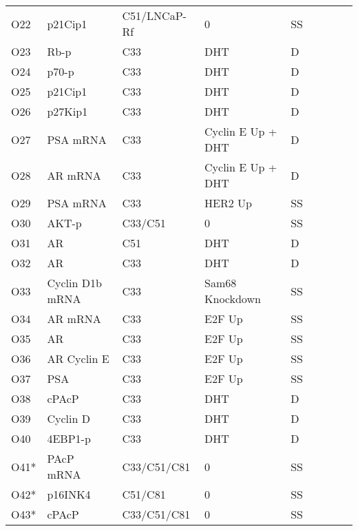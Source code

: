 \begin{center}
\begin{scriptsize}
\begin{supertabular}{l l l l l l l l l }
O22  & p21Cip1 & C51/LNCaP-Rf  & 0 & SS & \cite{Murillo2001}\\
O23  & Rb-p & C33 & DHT & D & \cite{Xu2006}\\
O24  & p70-p & C33 & DHT & D & \cite{Xu2006}\\
O25  & p21Cip1 & C33 & DHT & D & \cite{Knudsen1998}\\
O26  & p27Kip1 & C33 & DHT & D & \cite{Knudsen1998}\\
O27  & PSA mRNA & C33 & Cyclin E Up + DHT & D & \cite{Yamamoto2000}\\
O28  & AR mRNA & C33 & Cyclin E Up + DHT & D & \cite{Yamamoto2000}\\
O29  & PSA mRNA & C33 & HER2 Up & SS & \cite{Yeh1999}\\
O30  & AKT-p & C33/C51 & 0 & SS & \cite{Lin2003}\\
O31  & AR & C51 & DHT & D & \cite{Lin2003}\\
O32  & AR & C33 & DHT & D & \cite{Chen2009}\\
O33  & Cyclin D1b mRNA & C33 & Sam68 Knockdown & SS & \cite{Paronetto2010}\\
O34  & AR mRNA & C33 & E2F Up & SS & \cite{Davis2006}\\
O35  & AR & C33 & E2F Up & SS & \cite{Davis2006}\\
O36  & AR Cyclin E & C33 & E2F Up & SS & \cite{Davis2006}\\
O37  & PSA & C33 & E2F Up & SS & \cite{Davis2006}\\
O38  & cPAcP & C33 & DHT & D & \cite{Meng2000}\\
O39  & Cyclin D & C33 & DHT & D &  \cite{Xu2006}\\
O40  & 4EBP1-p & C33 & DHT & D &  \cite{Xu2006}\\
O41*  & PAcP mRNA & C33/C51/C81 & 0 & SS & \cite{Lin2000} \\
O42*  & p16INK4 & C51/C81 & 0 & SS & \cite{Murillo2001}\\
O43*  & cPAcP & C33/C51/C81 & 0 & SS & \cite{Lin2001}\\


\end{supertabular}
\end{scriptsize}
\end{center}
%
 
 

 
 
 
 
 
 
 
 

  
 
  
   


 
 
 
 
 
 
 
 
 
 
 
 
 
 
 
 
 
